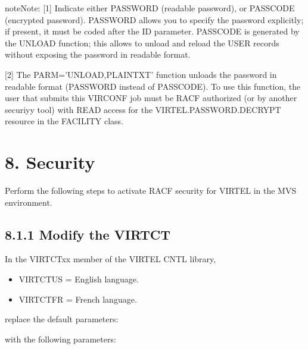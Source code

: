 \documentclass[letterpaper,10pt,english]{sphinxmanual}
\begin{document}
\begin{sphinxadmonition}{note}{Note:}
{[}1{]} Indicate either PASSWORD (readable password), or PASSCODE (encrypted password). PASSWORD allows you to specify the password explicitly; if present, it must be coded after the ID parameter. PASSCODE is generated by the UNLOAD function; this allows to unload and reload the USER records without exposing the password in readable format.

{[}2{]} The PARM=’UNLOAD,PLAINTXT’ function unloads the password in readable format (PASSWORD instead of PASSCODE). To use this function, the user that submits this VIRCONF job must be RACF authorized (or by another securiyy tool) with READ access for the VIRTEL.PASSWORD.DECRYPT resource in the FACILITY class.
\end{sphinxadmonition}


\chapter{8. Security}
\label{\detokenize{Installation_Guide:v457ig-security}}\label{\detokenize{Installation_Guide:security}}
Perform the following steps to activate RACF security for VIRTEL in the MVS environment.


\section{8.1.1 Modify the VIRTCT}
\label{\detokenize{Installation_Guide:modify-the-virtct}}
In the VIRTCTxx member of the VIRTEL CNTL library,
\begin{itemize}
\item {} 
VIRTCTUS = English language.

\item {} 
VIRTCTFR = French language.

\end{itemize}

replace the default parameters:

\begin{sphinxVerbatim}[commandchars=\\\{\}]
\end{sphinxVerbatim}

with the following parameters:

\begin{sphinxVerbatim}[commandchars=\\\{\}]
\end{sphinxVerbatim}
\end{document}
